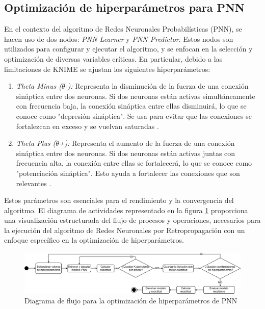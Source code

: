 \subsection{Optimización de hiperparámetros para PNN}
En el contexto del algoritmo de Redes Neuronales Probabilísticas (PNN), se hacen uso de dos nodos: \textit{PNN Learner} y \textit{PNN Predictor}. Estos nodos son utilizados para configurar y ejecutar el algoritmo, y se enfocan en la selección y optimización de diversas variables críticas. En particular, debido a las limitaciones de KNIME se ajustan los siguientes hiperparámetros:

	\begin{enumerate}
		\item \textit{Theta Minus ($\theta$-):} Representa la disminución de la fuerza de una conexión sináptica entre dos neuronas. Si dos neuronas están activas simultáneamente con frecuencia baja, la conexión sináptica entre ellas disminuirá, lo que se conoce como "depresión sináptica". Se usa para evitar que las conexiones se fortalezcan en exceso y se vuelvan saturadas \citep{montavon2012neural}.
		\item \textit{Theta Plus ($\theta$+):} Representa el aumento de la fuerza de una conexión sináptica entre dos neuronas. Si dos neuronas están activas juntas con frecuencia alta, la conexión entre ellas se fortalecerá, lo que se conoce como "potenciación sináptica". Esto ayuda a fortalecer las conexiones que son relevantes \citep{montavon2012neural}.
\end{enumerate}

Estos parámetros son esenciales para el rendimiento y la convergencia del algoritmo. El diagrama de actividades representado en la figura \ref{fig:optimizacion-pnn} proporciona una visualización estructurada del flujo de procesos y operaciones, necesarios para la ejecución del algoritmo de Redes Neuronales por Retropropagación con un enfoque específico en la optimización de hiperparámetros.

\begin{figure}[H]
	\centering
	\includegraphics[width=1\linewidth]{"figuras/capi 2/hpo/Optimizacion PNN"}
	\caption{Diagrama de flujo para la optimización de hiperparámetros de PNN}
	\label{fig:optimizacion-pnn}
\end{figure}


